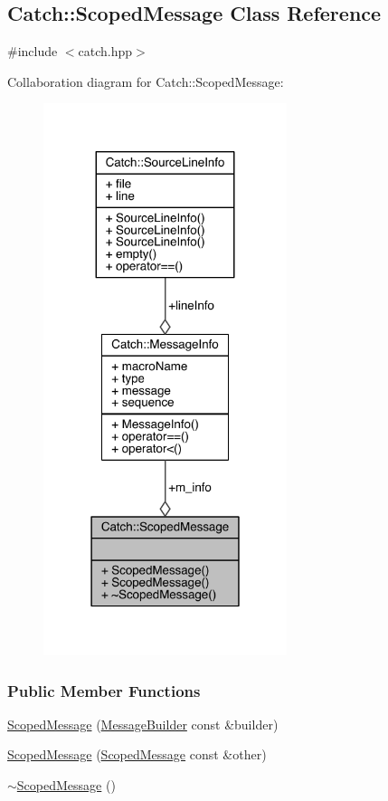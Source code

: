 \hypertarget{a00071}{}\subsection{Catch\+:\+:Scoped\+Message Class Reference}
\label{a00071}


{\ttfamily \#include $<$catch.\+hpp$>$}



Collaboration diagram for Catch\+:\+:Scoped\+Message\+:\nopagebreak
\begin{figure}[H]
\begin{center}
\leavevmode
\includegraphics[width=202pt]{a00259}
\end{center}
\end{figure}
\subsubsection*{Public Member Functions}
\begin{DoxyCompactItemize}
\item 
\hyperlink{a00071_a5cc59f0f2ebe840e6607f83004d49a17}{Scoped\+Message} (\hyperlink{a00049}{Message\+Builder} const \&builder)
\item 
\hyperlink{a00071_ae03a17fd47220d563d4abc73e7518e29}{Scoped\+Message} (\hyperlink{a00071}{Scoped\+Message} const \&other)
\item 
\hyperlink{a00071_a43190843f9eeb84a0b42b0bc95fdf93a}{$\sim$\+Scoped\+Message} ()
\end{DoxyCompactItemize}
